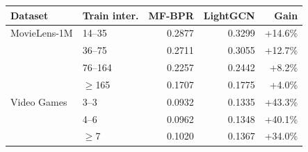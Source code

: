 \begin{tabular}{llrrr}
\toprule
Dataset & Train inter. & MF-BPR & LightGCN & Gain \\
\midrule
MovieLens-1M & 14--35 & 0.2877 & 0.3299 & +14.6\% \\
 & 36--75 & 0.2711 & 0.3055 & +12.7\% \\
 & 76--164 & 0.2257 & 0.2442 & +8.2\% \\
 & $\geq$165 & 0.1707 & 0.1775 & +4.0\% \\
\midrule
Video Games & 3--3 & 0.0932 & 0.1335 & +43.3\% \\
 & 4--6 & 0.0962 & 0.1348 & +40.1\% \\
 & $\geq$7 & 0.1020 & 0.1367 & +34.0\% \\
\bottomrule
\end{tabular}
